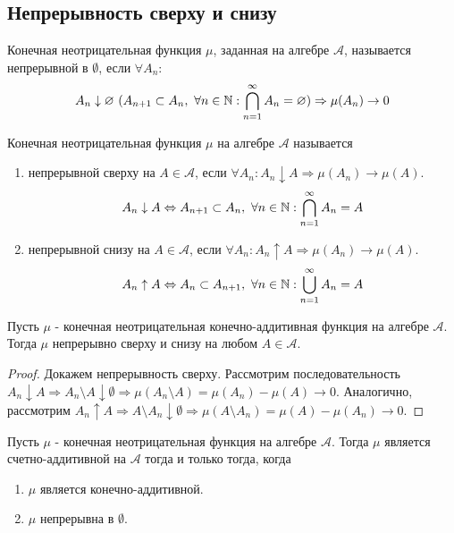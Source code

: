 \documentclass[a4paper, 12pt]{article}
\begin{document}
\subsection{Непрерывность сверху и снизу}
\begin{definition}
    Конечная неотрицательная функция $\mu$, заданная на алгебре $\mathcal{A}$, называется непрерывной в $\emptyset$, если $\forall A_n$:
    \[A_n \downarrow \varnothing\ (A_{n+1}\subset A_n,\ \forall n\in \mathbb{N}: \bigcap\limits_{n=1}^{\infty}A_n=\varnothing) \Rightarrow \mu(A_n)\to 0\]
\end{definition}
\begin{definition}
    Конечная неотрицательная функция $\mu$ на алгебре $\mathcal{A}$ называется 
    \begin{enumerate}
        \item непрерывной сверху на $A \in \mathcal{A}$, если $\forall A_n : A_n\downarrow A \Rightarrow \mu(A_n)\to \mu(A)$.\\
        \[A_n \downarrow A \Leftrightarrow A_{n+1}\subset A_n,\ \forall n\in \mathbb{N}: \bigcap\limits_{n=1}^{\infty}A_n=A\]
        \item непрерывной снизу на $A\in \mathcal{A}$, если $\forall A_n: A_n\uparrow A \Rightarrow \mu(A_n)\to \mu(A)$.
        \[A_n \uparrow A \Leftrightarrow A_{n}\subset A_{n+1},\ \forall n\in \mathbb{N}: \bigcup\limits_{n=1}^{\infty}A_n=A\]
    \end{enumerate}
\end{definition}
\begin{lemma}
    Пусть $\mu$ - конечная неотрицательная конечно-аддитивная функция на алгебре $\mathcal{A}$. Тогда $\mu$ непрерывно сверху и снизу на любом $A\in \mathcal{A}$.
\end{lemma}
\begin{proof}
    Докажем непрерывность сверху. Рассмотрим последовательность $A_n \downarrow A \Rightarrow A_n\setminus A \downarrow \emptyset \Rightarrow \mu(A_n\setminus A)=\mu(A_n)-\mu(A)\to 0$. Аналогично, рассмотрим $A_n\uparrow A \Rightarrow A\setminus A_n \downarrow \emptyset \Rightarrow \mu(A\setminus A_n)=\mu(A)-\mu(A_n)\to 0$.
\end{proof}
\begin{theorem}
    Пусть $\mu$ - конечная неотрицательная функция на алгебре $\mathcal{A}$. Тогда $\mu$ является счетно-аддитивной на $\mathcal{A}$ тогда и только тогда, когда
    \begin{enumerate}
        \item $\mu$ является конечно-аддитивной.
        \item $\mu$ непрерывна в $\emptyset$.
    \end{enumerate}
\end{theorem}
\end{document}
